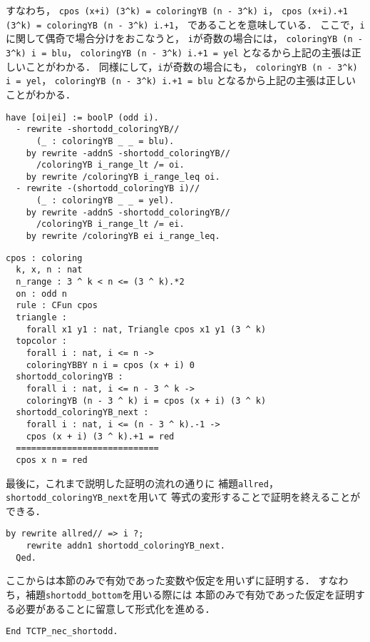 すなわち，
{\tt{cpos (x+i) (3\verb|^|k) = coloringYB (n - 3\verb|^|k) i}}，
{\tt{cpos (x+i).+1 (3\verb|^|k) = coloringYB (n - 3\verb|^|k) i.+1}}，
であることを意味している．
ここで，{\tt{i}}に関して偶奇で場合分けをおこなうと，
{\tt{i}}が奇数の場合には，
{\tt{coloringYB (n - 3\verb|^|k) i = blu}}，
{\tt{coloringYB (n - 3\verb|^|k) i.+1 = yel}}
となるから上記の主張は正しいことがわかる．
同様にして，{\tt{i}}が奇数の場合にも，
{\tt{coloringYB (n - 3\verb|^|k) i = yel}}，
{\tt{coloringYB (n - 3\verb|^|k) i.+1 = blu}}
となるから上記の主張は正しいことがわかる．
\begin{lstlisting}[language=Coq]
  have [oi|ei] := boolP (odd i).
  - rewrite -shortodd_coloringYB//
      (_ : coloringYB _ _ = blu).
    by rewrite -addnS -shortodd_coloringYB//
      /coloringYB i_range_lt /= oi.
    by rewrite /coloringYB i_range_leq oi.    
  - rewrite -(shortodd_coloringYB i)//
      (_ : coloringYB _ _ = yel).
    by rewrite -addnS -shortodd_coloringYB//
      /coloringYB i_range_lt /= ei.
    by rewrite /coloringYB ei i_range_leq.
\end{lstlisting}
\begin{lstlisting}[language=Coq]
  cpos : coloring
  k, x, n : nat
  n_range : 3 ^ k < n <= (3 ^ k).*2
  on : odd n
  rule : CFun cpos
  triangle :
    forall x1 y1 : nat, Triangle cpos x1 y1 (3 ^ k)
  topcolor :
    forall i : nat, i <= n ->
    coloringYBBY n i = cpos (x + i) 0
  shortodd_coloringYB :
    forall i : nat, i <= n - 3 ^ k ->
    coloringYB (n - 3 ^ k) i = cpos (x + i) (3 ^ k)
  shortodd_coloringYB_next :
    forall i : nat, i <= (n - 3 ^ k).-1 ->
    cpos (x + i) (3 ^ k).+1 = red
  ============================
  cpos x n = red
\end{lstlisting}
最後に，これまで説明した証明の流れの通りに
補題{\tt{allred}}，{\tt{shortodd\_coloringYB\_next}}を用いて
等式の変形することで証明を終えることができる．
\begin{lstlisting}[language=Coq]
    by rewrite allred// => i ?;
    rewrite addn1 shortodd_coloringYB_next.
  Qed.
\end{lstlisting}

ここからは本節のみで有効であった変数や仮定を用いずに証明する．
すなわち，補題{\tt{shortodd\_bottom}}を用いる際には
本節のみで有効であった仮定を証明する必要があることに留意して形式化を進める．
\begin{lstlisting}[language=Coq]
  End TCTP_nec_shortodd.
\end{lstlisting}

